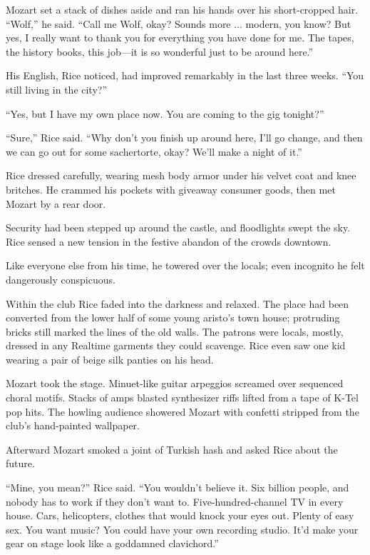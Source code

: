 Mozart set a stack of dishes aside and ran his hands over his short-cropped hair. ``Wolf,'' he said. ``Call me Wolf, okay? Sounds more ... modern, you know? But yes, I really want to thank you for everything you have done for me. The tapes, the history books, this job—it is so wonderful just to be around here.''

His English, Rice noticed, had improved remarkably in the last three weeks. ``You still living in the city?''

``Yes, but I have my own place now. You are coming to the gig tonight?''

``Sure,'' Rice said. ``Why don't you finish up around here, I'll go change, and then we can go out for some sachertorte, okay? We'll make a night of it.''

Rice dressed carefully, wearing mesh body armor under his velvet coat and knee britches. He crammed his pockets with giveaway consumer goods, then met Mozart by a rear door.

Security had been stepped up around the castle, and floodlights swept the sky. Rice sensed a new tension in the festive abandon of the crowds downtown.

Like everyone else from his time, he towered over the locals; even incognito he felt dangerously conspicuous.

Within the club Rice faded into the darkness and relaxed. The place had been converted from the lower half of some young aristo's town house; protruding bricks still marked the lines of the old walls. The patrons were locals, mostly, dressed in any Realtime garments they could scavenge. Rice even saw one kid wearing a pair of beige silk panties on his head.

Mozart took the stage. Minuet-like guitar arpeggios screamed over sequenced choral motifs. Stacks of amps blasted synthesizer riffs lifted from a tape of K-Tel pop hits. The howling audience showered Mozart with confetti stripped from the club's hand-painted wallpaper.

Afterward Mozart smoked a joint of Turkish hash and asked Rice about the future.

``Mine, you mean?'' Rice said. ``You wouldn't believe it. Six billion people, and nobody has to work if they don't want to. Five-hundred-channel TV in every house. Cars, helicopters, clothes that would knock your eyes out. Plenty of easy sex. You want music? You could have your own recording studio. It'd make your gear on stage look like a goddamned clavichord.''

